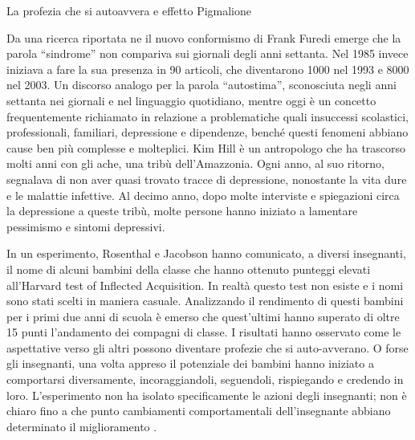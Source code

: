 \documentclass[12pt]{book} %
\begin{document}
\begin{mdframed}[linewidth=1pt]
La profezia che si autoavvera e effetto Pigmalione

Da una ricerca riportata ne il nuovo conformismo di Frank Furedi emerge che la parola “sindrome” non compariva sui giornali degli anni settanta. Nel 1985 invece iniziava a fare
la sua presenza in 90 articoli, che diventarono 1000 nel 1993 e 8000 nel 2003. Un discorso analogo per la parola
“autostima”, sconosciuta negli anni settanta nei giornali e nel linguaggio quotidiano, mentre oggi è un concetto frequentemente richiamato in relazione a problematiche quali insuccessi scolastici, professionali, familiari, depressione e dipendenze, benché questi fenomeni abbiano cause ben più complesse e molteplici. Kim Hill è un antropologo che ha trascorso molti anni con gli ache, una tribù dell'Amazzonia. Ogni anno, al suo
ritorno, segnalava di non aver quasi trovato tracce di depressione, nonostante la vita dure e le malattie infettive. Al
decimo anno, dopo molte interviste e spiegazioni circa la depressione a queste tribù, molte persone hanno iniziato a
lamentare pessimismo e sintomi depressivi.

In un esperimento, Rosenthal e Jacobson hanno comunicato, a diversi insegnanti, il nome di alcuni bambini della classe che hanno ottenuto punteggi elevati
all'Harvard test of Inflected Acquisition. In realtà questo test non esiste e i nomi sono stati scelti in maniera casuale. Analizzando il rendimento di questi bambini per i primi due anni di scuola è emerso che quest'ultimi hanno superato di oltre 15 punti l'andamento dei compagni di classe. I risultati hanno osservato come le aspettative verso gli altri possono diventare profezie che si auto-avverano. O forse gli insegnanti, una volta appreso il potenziale dei bambini hanno iniziato a comportarsi diversamente, incoraggiandoli, seguendoli, rispiegando e credendo in loro. L'esperimento non ha isolato specificamente le azioni degli insegnanti; non è chiaro fino a che punto cambiamenti comportamentali dell’insegnante abbiano determinato il miglioramento
.
\end{mdframed}
\end{document}
